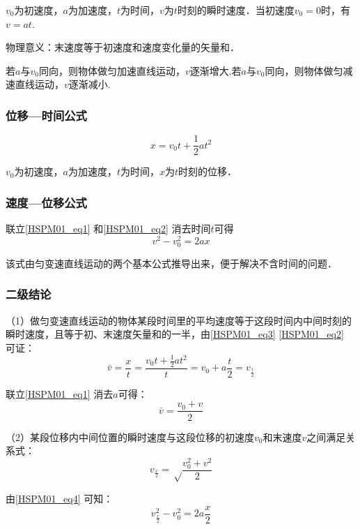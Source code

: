 $v_0$为初速度，$a$为加速度，$t$为时间，$v$为$t$时刻的瞬时速度．当初速度$v_0=0$时，有$v=at$.

物理意义：末速度等于初速度和速度变化量的矢量和．

若$a$与$v_0$同向，则物体做匀加速直线运动，$v$逐渐增大.若$a$与$v_0$同向，则物体做匀减速直线运动，$v$逐渐减小.

\subsubsection{位移—时间公式}
\begin{equation}\label{HSPM01_eq2}
x=v_0 t+\frac12at^2
\end{equation}

$v_0$为初速度，$a$为加速度，$t$为时间，$x$为$t$时刻的位移．

\subsubsection{速度—位移公式}
联立\autoref{HSPM01_eq1} 和\autoref{HSPM01_eq2} 消去时间$t$可得
\begin{equation}\label{HSPM01_eq4}
v^2-v_0^2=2ax
\end{equation}

该式由匀变速直线运动的两个基本公式推导出来，便于解决不含时间的问题．

\subsubsection{二级结论}
（1）做匀变速直线运动的物体某段时间里的平均速度等于这段时间内中间时刻的瞬时速度，且等于初、末速度矢量和的一半，由\autoref{HSPM01_eq3} \autoref{HSPM01_eq2} 可证：
\begin{equation}
\bar v=\frac xt=\frac{v_0t+\frac 12at^2}{t}=v_0+a\frac t2=v_{\frac t2}
\end{equation}

联立\autoref{HSPM01_eq1} 消去$a$可得：
\begin{equation}
\bar v=\frac{v_0+v}{2}
\end{equation}

（2）某段位移内中间位置的瞬时速度与这段位移的初速度$v_0$和末速度$v$之间满足关系式：
\begin{equation}
v_\frac x2=\sqrt \frac{v_0^2+v^2}2
\end{equation}

由\autoref{HSPM01_eq4} 可知：
\begin{equation}
v_{\frac x2}^2-v_0^2=2a\frac x2
\end{equation}

